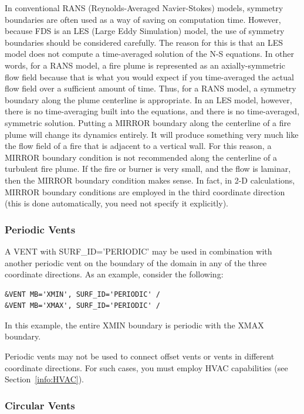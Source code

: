 \documentclass[11pt]{book}
\begin{document}
In conventional RANS (Reynolds-Averaged Navier-Stokes) models, symmetry boundaries are often used as a way of saving on computation time. However, because FDS is an LES (Large Eddy Simulation) model, the use of symmetry boundaries should be considered carefully. The reason for this is that an LES model does not compute a time-averaged solution of the N-S equations. In other words, for a RANS model, a fire plume is represented as an axially-symmetric flow field because that is what you would expect if you time-averaged the actual flow field over a sufficient amount of time. Thus, for a RANS model, a symmetry boundary along the plume centerline is appropriate. In an LES model, however, there is no time-averaging built into the equations, and there is no time-averaged, symmetric solution. Putting a {\ct MIRROR} boundary along the centerline of a fire plume will change its dynamics entirely. It will produce something very much like the flow field of a fire that is adjacent to a vertical wall. For this reason, a {\ct MIRROR} boundary condition is not recommended along the centerline of a turbulent fire plume. If the fire or burner is very small, and the flow is laminar, then the {\ct MIRROR} boundary condition makes sense. In fact, in 2-D calculations, {\ct MIRROR} boundary conditions are employed in the third coordinate direction (this is done automatically, you need not specify it explicitly).

\subsubsection{Periodic Vents}
\label{sec:periodic}

A {\ct VENT} with {\ct SURF\_ID='PERIODIC'} may be used in combination with another periodic vent on the boundary of the domain in any of the three coordinate directions.  As an example, consider the following:

\begin{lstlisting}
&VENT MB='XMIN', SURF_ID='PERIODIC' /
&VENT MB='XMAX', SURF_ID='PERIODIC' /
\end{lstlisting}
In this example, the entire {\ct XMIN} boundary is periodic with the {\ct XMAX} boundary.

Periodic vents may not be used to connect offset vents or vents in different coordinate directions.  For such cases, you must employ HVAC capabilities (see Section~\ref{info:HVAC}).

\subsubsection{Circular Vents}
\label{sec:circvents}
\end{document}
